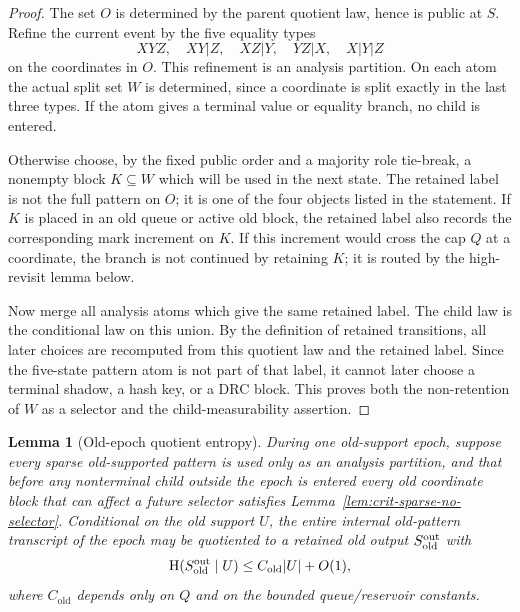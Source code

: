 \documentclass[11pt]{article}
\newtheorem{lemma}[theorem]{Lemma}
\theoremstyle{remark}
\newcommand{\HH}{\mathrm H}
\newcommand{\old}{\mathrm{old}}
\begin{document}
\begin{proof}
The set $O$ is determined by the parent quotient law, hence is public at $S$.  Refine the current event by the five equality types
\[
XYZ,\quad XY|Z,\quad XZ|Y,\quad YZ|X,\quad X|Y|Z
\]
on the coordinates in $O$.  This refinement is an analysis partition.  On each atom the actual split set $W$ is determined, since a coordinate is split exactly in the last three types.  If the atom gives a terminal value or equality branch, no child is entered.

Otherwise choose, by the fixed public order and a majority role tie-break, a nonempty block $K\subseteq W$ which will be used in the next state.  The retained label is not the full pattern on $O$; it is one of the four objects listed in the statement.  If $K$ is placed in an old queue or active old block, the retained label also records the corresponding mark increment on $K$.  If this increment would cross the cap $Q$ at a coordinate, the branch is not continued by retaining $K$; it is routed by the high-revisit lemma below.

Now merge all analysis atoms which give the same retained label.  The child law is the conditional law on this union.  By the definition of retained transitions, all later choices are recomputed from this quotient law and the retained label.  Since the five-state pattern atom is not part of that label, it cannot later choose a terminal shadow, a hash key, or a DRC block.  This proves both the non-retention of $W$ as a selector and the child-measurability assertion.
\end{proof}

\begin{lemma}[Old-epoch quotient entropy]\label{lem:crit-old-entropy}
During one old-support epoch, suppose every sparse old-supported pattern is used only as an analysis partition, and that before any nonterminal child outside the epoch is entered every old coordinate block that can affect a future selector satisfies Lemma~\ref{lem:crit-sparse-no-selector}.  Conditional on the old support $U$, the entire internal old-pattern transcript of the epoch may be quotiented to a retained old output $S_{\old}^{\rm out}$ with
\[
        \HH(S_{\old}^{\rm out}\mid U)
        \le C_{\old}|U|+O(1),
\]
where $C_{\old}$ depends only on $Q$ and on the bounded queue/reservoir constants.
\end{lemma}
\end{document}
